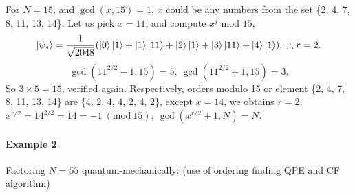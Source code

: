 \documentclass[]{book}
\theoremstyle{nonumberplain}
\begin{document}
    For $N=15$, and $\gcd(x,15)=1$, $x$ could be any numbers from the set \{2, 4, 7, 8, 11, 13, 14\}. Let us pick $x=11$, and compute $x^j \text{ mod }15$,
    $$\ket{\psi_s} = \frac{1}{\sqrt{2048}}(\ket{0}\ket{1}+\ket{1}\ket{11}+\ket{2}\ket{1}+\ket{3}\ket{11}+\ket{4}\ket{1}), \ \therefore r=2.$$
    $$\gcd(11^{2/2}-1,15)=5, \ \gcd(11^{2/2}+1,15)=3.$$
    So $3 \times 5 = 15$, verified again.
    Respectively, orders modulo 15 or element \{2, 4, 7, 8, 11, 13, 14\} are \{4, 2, 4, 4, 2, 4, 2\}, except $x=14$, we obtains $r=2$, $x^{r/2}=14^{2/2}=14=-1 \ (\text{mod} \ 15), \ \gcd(x^{r/2}+1,N)=N$.

\paragraph{Example 2}
    Factoring \textbf{$N=55$} quantum-mechanically: (use of ordering finding QPE and CF algorithm)
\end{document}
